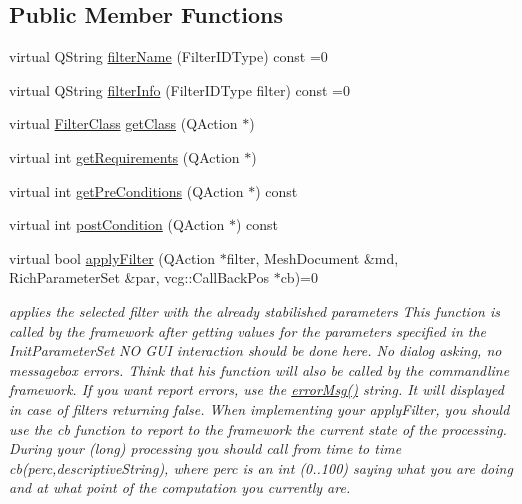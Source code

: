 \subsection*{Public Member Functions}
\begin{DoxyCompactItemize}
\item 
virtual Q\+String \hyperlink{class_mesh_filter_interface_ad57edd291a220d0b2384627c2f0657b9}{filter\+Name} (Filter\+I\+D\+Type) const =0
\item 
virtual Q\+String \hyperlink{class_mesh_filter_interface_aa75cbc99d9d0b411676b1ae3aa693568}{filter\+Info} (Filter\+I\+D\+Type filter) const =0
\item 
virtual \hyperlink{class_mesh_filter_interface_a67a90dc6ac04fafd04e7cb8c38d0e20f}{Filter\+Class} \hyperlink{class_mesh_filter_interface_a56925d19f0d24ffb86b3f2e6b777711c}{get\+Class} (Q\+Action $\ast$)
\item 
virtual int \hyperlink{class_mesh_filter_interface_aa6bcad28fee2de9526b3f01c8ac158a5}{get\+Requirements} (Q\+Action $\ast$)
\item 
virtual int \hyperlink{class_mesh_filter_interface_ab9070bf6b4ad6a205641b4c9fa6afaa4}{get\+Pre\+Conditions} (Q\+Action $\ast$) const
\item 
virtual int \hyperlink{class_mesh_filter_interface_a551a07190ee6f9333fdd94f0f38e417a}{post\+Condition} (Q\+Action $\ast$) const
\item 
virtual bool \hyperlink{class_mesh_filter_interface_ab97c75416be79ff1fa16333b362955cf}{apply\+Filter} (Q\+Action $\ast$filter, Mesh\+Document \&md, Rich\+Parameter\+Set \&par, vcg\+::\+Call\+Back\+Pos $\ast$cb)=0
\begin{DoxyCompactList}\small\item\em applies the selected filter with the already stabilished parameters This function is called by the framework after getting values for the parameters specified in the Init\+Parameter\+Set NO G\+UI interaction should be done here. No dialog asking, no messagebox errors. Think that his function will also be called by the commandline framework. If you want report errors, use the \hyperlink{class_mesh_filter_interface_aedd8f6d4430e3327cbddee552d4fbe4f}{error\+Msg()} string. It will displayed in case of filters returning false. When implementing your apply\+Filter, you should use the cb function to report to the framework the current state of the processing. During your (long) processing you should call from time to time cb(perc,descriptive\+String), where perc is an int (0..100) saying what you are doing and at what point of the computation you currently are. \end{DoxyCompactList}\item 

\end{DoxyCompactItemize}
